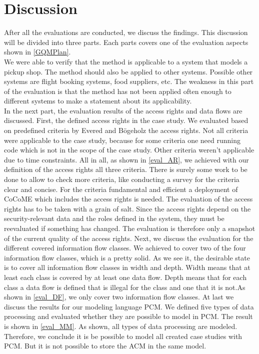\section{Discussion}
After all the evaluations are conducted, we discuss the findings. This discussion will be divided into three parts. Each parts covers one of the evaluation aspects shown in \autoref{GQMPlan}.\\
We were able to verify that the method is applicable to a system that models a pickup shop. The method should also be applied to other systems. Possible other systems are flight booking systems, food suppliers, etc. The weakness in this part of the evaluation is that the method has not been applied often enough to different systems to make a statement about its applicability.\\
In the next part, the evaluation results of the access rights and data flows are discussed. First, the defined access rights in the case study. We evaluated based on predefined criteria by Evered and Bögeholz \cite{CaseStudyAndAccessrigths} the access rights. Not all criteria were applicable to the case study, because for some criteria one need running code which is not in the scope of the case study. Other criteria weren't applicable due to time constraints. All in all, as shown in \autoref{eval_AR}, we achieved with our definition of the access rights all three criteria. There is surely some work to be done to allow to check more criteria, like conducting a survey for the criteria clear and concise. For the criteria fundamental and efficient a deployment of CoCoME which includes the access rights is needed. The evaluation of the access rights has to be taken with a grain of salt. Since the access rights depend on the security-relevant data and the roles defined in the system, they must be reevaluated if something has changed.  The evaluation is therefore only a snapshot of the current quality of the access rights. Next, we discuss the evaluation for the different covered information flow classes. We achieved to cover two of the four information flow classes, which is a pretty solid. As we see it, the desirable state is to cover all information flow classes in width and depth. Width means that at least each class is covered by at least one data flow. Depth means that for each class a data flow is defined that is illegal for the class and one that it is not.As shown in \autoref{eval_DF}, we only cover two information flow classes. 
At last we discuss the results for our modeling language PCM. We defined five types of data processing and evaluated whether they are possible to model in PCM. The result is shown in \autoref{eval_MM}. As shown, all types of data processing are modeled. Therefore, we conclude it is be possible to model all created case studies with PCM. But it is not possible to store the ACM in the same model. 
